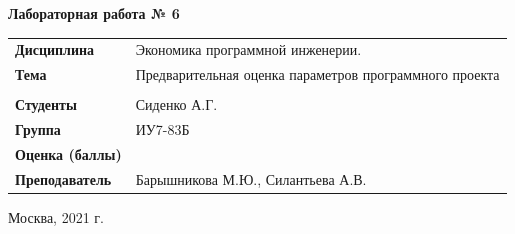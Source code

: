 \documentclass[a4paper,14pt]{extreport} %
\begin{document}
\begin{titlepage}
    \vspace{2cm}

    \begin{center}
        \textbf{Лабораторная работа № 6} \\
        \vspace{0.5cm}
    \end{center}

    \vspace{4cm}

    \begin{flushleft}
        \begin{tabular}{ll}
            \textbf{Дисциплина} & Экономика программной инженерии.  \\
            \textbf{Тема} & Предварительная оценка параметров программного проекта \\
            \\
            \textbf{Студенты} & Сиденко А.Г.\\
            \textbf{Группа} & ИУ7-83Б \\
            \textbf{Оценка (баллы)} & \\
            \textbf{Преподаватель} & Барышникова М.Ю., Силантьева А.В.   \\
        \end{tabular}
    \end{flushleft}

    \vspace{4cm}

   \begin{center}
        Москва, 2021 г.
    \end{center}

\end{titlepage}
\end{document}
